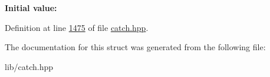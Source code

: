 {\bfseries Initial value\+:}
\begin{DoxyCode}{0}
\DoxyCodeLine{=}

\end{DoxyCode}


Definition at line \mbox{\hyperlink{catch_8hpp_source_l01475}{1475}} of file \mbox{\hyperlink{catch_8hpp_source}{catch.\+hpp}}.



The documentation for this struct was generated from the following file\+:\begin{DoxyCompactItemize}
\item 
lib/catch.\+hpp\end{DoxyCompactItemize}
